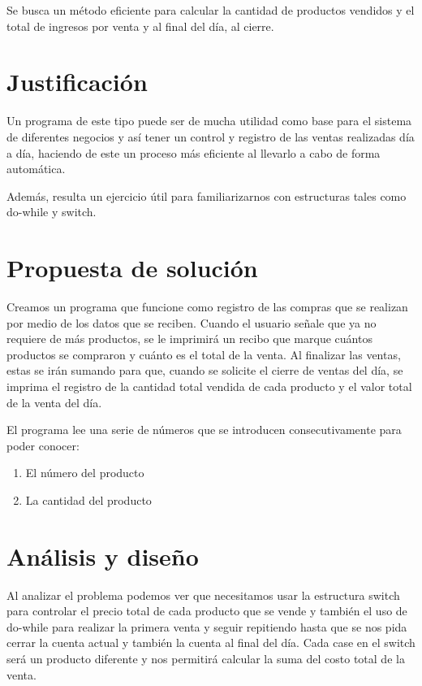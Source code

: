 \documentclass[12pt, letterpaper]{article}
\begin{document}
    
    Se busca un método eficiente para calcular la cantidad de productos vendidos y el total de ingresos por venta y al final del día, al cierre. 
    
    
    \section{Justificación}
    Un programa de este tipo puede ser de mucha utilidad como base para el sistema de diferentes negocios y así tener un control y registro de las ventas realizadas día a día, haciendo de este un proceso más eficiente al llevarlo a cabo de forma automática.
    
    Además, resulta un ejercicio útil para familiarizarnos con estructuras tales como do-while y switch.
 

    
    
    \section{Propuesta de solución}
   Creamos un programa que funcione como registro de las compras que se realizan por medio de los datos que se reciben. Cuando el usuario señale que ya no requiere de más productos, se le imprimirá un recibo que marque cuántos productos se compraron y cuánto es el total de la venta. Al finalizar las ventas, estas se irán sumando para que, cuando se solicite el cierre de ventas del día, se imprima el registro de la cantidad total vendida de cada producto y el valor total de la venta del día.
   
   El programa lee una serie de números que se introducen consecutivamente para poder conocer:
   \begin{enumerate}
       \item El número del producto
       \item La cantidad del producto
   \end{enumerate}
   
    
    \section{Análisis y diseño}
      Al analizar el problema podemos ver que necesitamos usar la estructura switch para controlar el precio total de cada producto que se vende y también el uso de do-while para realizar la primera venta y seguir repitiendo hasta que se nos pida cerrar la cuenta actual y también la cuenta al final del día. Cada case en el switch será un producto diferente y nos permitirá calcular la suma del costo total de la venta.
      
\end{document}
